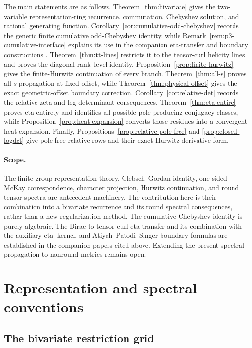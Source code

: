 \documentclass[11pt]{article}
\theoremstyle{definition}
\begin{document}
The main statements are as follows.  Theorem~\ref{thm:bivariate} gives the
two-variable representation-ring recurrence, commutation, Chebyshev
solution, and rational generating function.  Corollary~\ref{cor:cumulative-odd-chebyshev}
records the generic finite cumulative odd-Chebyshev identity, while
Remark~\ref{rem:p3-cumulative-interface} explains its use in the companion
eta-transfer and boundary constructions
\cite{Mahmood2026DiracToTensorCurlEtaTransfer,
Mahmood2026SteinWeissAPSBoundary}.
Theorem~\ref{thm:tt-lines}
restricts it to the tensor-curl helicity lines and proves the diagonal
rank--level identity.  Proposition~\ref{prop:finite-hurwitz} gives the
finite-Hurwitz continuation of every branch.  Theorem~\ref{thm:all-s}
proves all-$s$ propagation at fixed offset, while
Theorem~\ref{thm:physical-offset} gives the exact geometric-offset boundary
correction.  Corollary~\ref{cor:relative-det} records the relative zeta and
log-determinant consequences.  Theorem~\ref{thm:eta-entire} proves
eta-entirety and identifies all possible pole-producing conjugacy
classes, while Proposition~\ref{prop:heat-expansion} converts those
residues into a convergent heat expansion.  Finally,
Propositions~\ref{prop:relative-pole-free} and
\ref{prop:closed-logdet} give pole-free relative rows and their exact
Hurwitz-derivative form.

\paragraph{Scope.}
The finite-group representation theory, Clebsch--Gordan identity,
one-sided McKay correspondence, character projection, Hurwitz
continuation, and round tensor spectra are antecedent machinery.  The
contribution here is their combination into a bivariate recurrence and its
round spectral consequences, rather than a new regularization method.  The
cumulative Chebyshev identity is purely algebraic.  The Dirac-to-tensor-curl
eta transfer and its combination with the auxiliary eta, kernel, and
Atiyah--Patodi--Singer boundary formulas are established in the companion
papers cited above.  Extending the present spectral propagation to nonround
metrics remains open.

\section{Representation and spectral conventions}

\subsection{The bivariate restriction grid}
\end{document}

